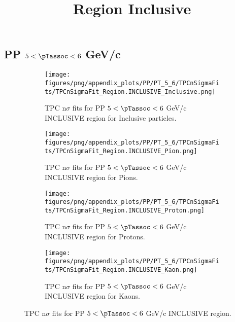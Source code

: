     
            \subsection*{PP $5 < \pTassoc < 6$ GeV/c}
            \begin{figure}[H]
                \title{Region Inclusive}
                \begin{subfigure}[b]{0.5\textwidth}
                    \centering
                    \texttt{[image: figures/png/appendix\_plots/PP/PT\_5\_6/TPCnSigmaFits/TPCnSigmaFit\_Region.INCLUSIVE\_Inclusive.png]}
                    \caption{TPC n$\sigma$ fits for PP $5 < \pTassoc < 6$ GeV/c INCLUSIVE region for Inclusive particles.}
                    \label{fig:appendix_PP_$5 < \pTassoc < 6$ GeV/c_INCLUSIVE_Inclusive}
                \end{subfigure}
                \begin{subfigure}[b]{0.5\textwidth}
                    \centering
                    \texttt{[image: figures/png/appendix\_plots/PP/PT\_5\_6/TPCnSigmaFits/TPCnSigmaFit\_Region.INCLUSIVE\_Pion.png]}
                    \caption{TPC n$\sigma$ fits for PP $5 < \pTassoc < 6$ GeV/c INCLUSIVE region for Pions.}
                    \label{fig:appendix_PP_$5 < \pTassoc < 6$ GeV/c_INCLUSIVE_Pion}
                \end{subfigure}
                \begin{subfigure}[b]{0.5\textwidth}
                    \centering
                    \texttt{[image: figures/png/appendix\_plots/PP/PT\_5\_6/TPCnSigmaFits/TPCnSigmaFit\_Region.INCLUSIVE\_Proton.png]}
                    \caption{TPC n$\sigma$ fits for PP $5 < \pTassoc < 6$ GeV/c INCLUSIVE region for Protons.}
                    \label{fig:appendix_PP_$5 < \pTassoc < 6$ GeV/c_INCLUSIVE_Proton}
                \end{subfigure}
                \begin{subfigure}[b]{0.5\textwidth}
                    \centering
                    \texttt{[image: figures/png/appendix\_plots/PP/PT\_5\_6/TPCnSigmaFits/TPCnSigmaFit\_Region.INCLUSIVE\_Kaon.png]}
                    \caption{TPC n$\sigma$ fits for PP $5 < \pTassoc < 6$ GeV/c INCLUSIVE region for Kaons.}
                    \label{fig:appendix_PP_$5 < \pTassoc < 6$ GeV/c_INCLUSIVE_Kaon}
                \end{subfigure}
                \caption{TPC n$\sigma$ fits for PP $5 < \pTassoc < 6$ GeV/c INCLUSIVE region.}
                \label{fig:appendix_PP_$5 < \pTassoc < 6$ GeV/c_INCLUSIVE}
            \end{figure}
